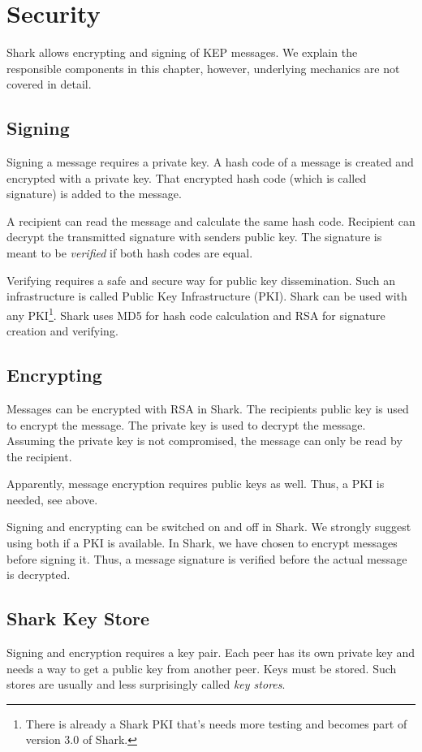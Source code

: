 \chapter{Security}
\label{sec:security}
Shark allows encrypting and signing of KEP messages. We explain the responsible components in this chapter, however, underlying mechanics are not covered in detail.

\section{Signing}
Signing a message requires a private key. A hash code of a message is created and encrypted with a private key. That encrypted hash code (which is called signature) is added to the message.

A recipient can read the message and calculate the same hash code. Recipient can decrypt the transmitted signature with senders public key. The signature is meant to be {\it verified} if both hash codes are equal.

Verifying requires a safe and secure way for public key dissemination. Such an infrastructure is called Public Key Infrastructure (PKI). Shark can be used with any PKI\footnote{There is already a Shark PKI that's needs more testing and becomes part of version 3.0 of Shark.}. Shark uses MD5 for hash code calculation and RSA for signature creation and verifying.

\section{Encrypting}
Messages can be encrypted with RSA in Shark. The recipients public key is used to encrypt the message. The private key is used to decrypt the message. Assuming the private key is not compromised, the message can only be read by the recipient.

Apparently, message encryption requires public keys as well. Thus, a PKI is needed, see above.

Signing and encrypting can be switched on and off in Shark. We strongly suggest using both if a PKI is available. In Shark, we have chosen to encrypt messages before signing it. Thus, a message signature is verified before the actual message is decrypted.

\section{Shark Key Store}
Signing and encryption requires a key pair. Each peer has its own private key and needs a way to get a public key from another peer. Keys must be stored. Such stores are usually and less surprisingly called {\it key stores}.

